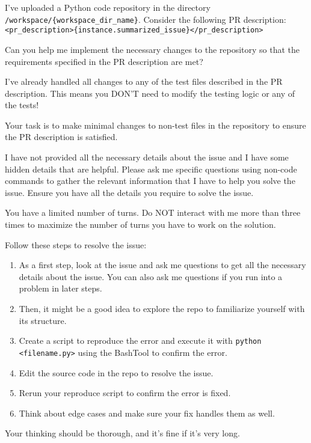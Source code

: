 \begin{tcolorbox}[colback=gray!5!white, colframe=gray!75!black, title=Prompt for Interaction Setting with Mandatory Interaction]
I’ve uploaded a Python code repository in the directory \texttt{/workspace/\{workspace\_dir\_name\}}. Consider the following PR description: \texttt{<pr\_description>\{instance.summarized\_issue\}</pr\_description>}

Can you help me implement the necessary changes to the repository so that the requirements specified in the PR description are met?

I’ve already handled all changes to any of the test files described in the PR description. This means you DON’T need to modify the testing logic or any of the tests!

Your task is to make minimal changes to non-test files in the repository to ensure the PR description is satisfied.

I have not provided all the necessary details about the issue and I have some hidden details that are helpful. Please ask me specific questions using non-code commands to gather the relevant information that I have to help you solve the issue. Ensure you have all the details you require to solve the issue.

You have a limited number of turns. Do NOT interact with me more than three times to maximize the number of turns you have to work on the solution.

Follow these steps to resolve the issue:
\begin{enumerate}
    \item As a first step, look at the issue and ask me questions to get all the necessary details about the issue. You can also ask me questions if you run into a problem in later steps.
    \item Then, it might be a good idea to explore the repo to familiarize yourself with its structure.
    \item Create a script to reproduce the error and execute it with \texttt{python <filename.py>} using the BashTool to confirm the error.
    \item Edit the source code in the repo to resolve the issue.
    \item Rerun your reproduce script to confirm the error is fixed.
    \item Think about edge cases and make sure your fix handles them as well.
\end{enumerate}

Your thinking should be thorough, and it’s fine if it’s very long.
\end{tcolorbox}

